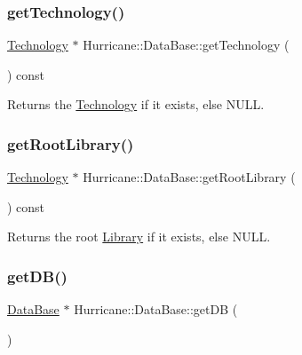 \subsubsection{\texorpdfstring{get\+Technology()}{getTechnology()}}
{\footnotesize\ttfamily \mbox{\hyperlink{classHurricane_1_1Technology}{Technology}} $\ast$ Hurricane\+::\+Data\+Base\+::get\+Technology (\begin{DoxyParamCaption}{ }\end{DoxyParamCaption}) const\hspace{0.3cm}{\ttfamily [inline]}}

\begin{DoxyReturn}{Returns}
the \mbox{\hyperlink{classHurricane_1_1Technology}{Technology}} if it exists, else {\ttfamily N\+U\+LL}. 
\end{DoxyReturn}
\mbox{\label{classHurricane_1_1DataBase_a4469391a3c5ae82caf090f1bdac4f29b}} 
\subsubsection{\texorpdfstring{get\+Root\+Library()}{getRootLibrary()}}
{\footnotesize\ttfamily \mbox{\hyperlink{classHurricane_1_1Technology}{Technology}} $\ast$ Hurricane\+::\+Data\+Base\+::get\+Root\+Library (\begin{DoxyParamCaption}{ }\end{DoxyParamCaption}) const\hspace{0.3cm}{\ttfamily [inline]}}

\begin{DoxyReturn}{Returns}
the root \mbox{\hyperlink{classHurricane_1_1Library}{Library}} if it exists, else {\ttfamily N\+U\+LL}. 
\end{DoxyReturn}
\mbox{\label{classHurricane_1_1DataBase_a53d0b9fcd06b73f3968c8f238f377a88}} 
\subsubsection{\texorpdfstring{get\+D\+B()}{getDB()}}
{\footnotesize\ttfamily \mbox{\hyperlink{classHurricane_1_1DataBase}{Data\+Base}} $\ast$ Hurricane\+::\+Data\+Base\+::get\+DB (\begin{DoxyParamCaption}{ }\end{DoxyParamCaption})\hspace{0.3cm}{\ttfamily [static]}}

